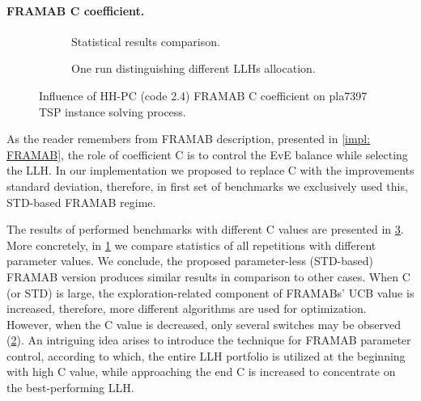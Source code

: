 \paragraph{FRAMAB C coefficient.}
\begin{figure}[t]
	\centering
	\begin{subfigure}{\textwidth}
		\vspace{-10pt}
		
		\caption{Statistical results comparison.}
		\label{eval:2:pict:framab c statistic}
	\end{subfigure}
	\begin{subfigure}{\textwidth}
		
		\vspace{-5pt}
		\caption{One run distinguishing different LLHs allocation.}
		\label{eval:2:pict:framab c one run}
	\end{subfigure}
	\caption{Influence of HH-PC (code 2.4) FRAMAB C coefficient on pla7397 TSP instance solving process.}
	\label{eval:2:pict:framab c}
\end{figure}

As the reader remembers from FRAMAB description, presented in \cref{impl: FRAMAB}, the role of coefficient C is to control the EvE balance while selecting the LLH. In our implementation we proposed to replace C with the improvements standard deviation, therefore, in first set of benchmarks we exclusively used this, STD-based FRAMAB regime.

The results of performed benchmarks with different C values are presented in \cref{eval:2:pict:framab c}. More concretely, in \cref{eval:2:pict:framab c statistic} we compare statistics of all repetitions with different parameter values. We conclude, the proposed parameter-less (STD-based) FRAMAB version produces similar results in comparison to other cases. When C (or STD) is large, the exploration-related component of FRAMABs' UCB value is increased, therefore, more different algorithms are used for optimization. However, when the C value is decreased, only several switches may be observed (\cref{eval:2:pict:framab c one run}). An intriguing idea arises to introduce the technique for FRAMAB parameter control, according to which, the entire LLH portfolio is utilized at the beginning with high C value, while approaching the end C is increased to concentrate on the best-performing LLH.


